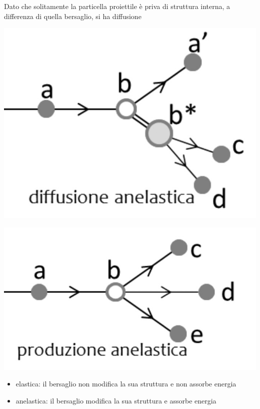 Dato che solitamente la particella proiettile è priva di struttura
interna, a differenza di quella bersaglio, si ha diffusione
\begin{marginfigure}
	\includegraphics{figs/diffusione-anelastica}
	\label{fig:diffusione-anelastica}
\end{marginfigure}

\begin{marginfigure}
	\includegraphics{figs/produzione-anelastica}
	\label{fig:produzione-anelastica}
\end{marginfigure}

\begin{itemize}
	\item
	elastica: il bersaglio non modifica la sua struttura e non assorbe
	energia
	\item
	anelastica: il bersaglio modifica la sua struttura e assorbe energia
\end{itemize}

